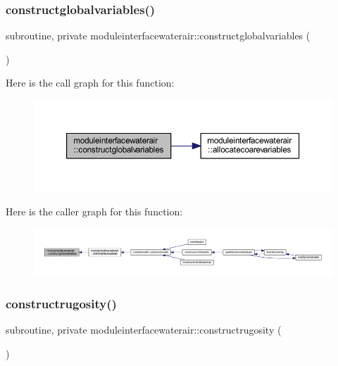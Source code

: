 \subsubsection{\texorpdfstring{constructglobalvariables()}{constructglobalvariables()}}
{\footnotesize\ttfamily subroutine, private moduleinterfacewaterair\+::constructglobalvariables (\begin{DoxyParamCaption}{ }\end{DoxyParamCaption})\hspace{0.3cm}{\ttfamily [private]}}

Here is the call graph for this function\+:\nopagebreak
\begin{figure}[H]
\begin{center}
\leavevmode
\includegraphics[width=350pt]{namespacemoduleinterfacewaterair_aade4da5319abf6cc9115d08e4cfb448b_cgraph}
\end{center}
\end{figure}
Here is the caller graph for this function\+:\nopagebreak
\begin{figure}[H]
\begin{center}
\leavevmode
\includegraphics[width=350pt]{namespacemoduleinterfacewaterair_aade4da5319abf6cc9115d08e4cfb448b_icgraph}
\end{center}
\end{figure}
\mbox{\label{namespacemoduleinterfacewaterair_ae5a4815896d07094361faa53fb69aa03}} 
\subsubsection{\texorpdfstring{constructrugosity()}{constructrugosity()}}
{\footnotesize\ttfamily subroutine, private moduleinterfacewaterair\+::constructrugosity (\begin{DoxyParamCaption}{ }\end{DoxyParamCaption})\hspace{0.3cm}{\ttfamily [private]}}

